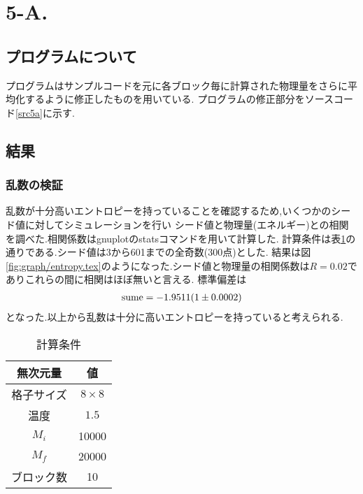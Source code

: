 \section{5-A.}
\subsection{プログラムについて}
プログラムはサンプルコードを元に各ブロック毎に計算された物理量をさらに平均化するように修正したものを用いている.
プログラムの修正部分をソースコード\ref{src5a}に示す.
\subsection{結果}
\subsubsection{乱数の検証}
乱数が十分高いエントロピーを持っていることを確認するため,いくつかのシード値に対してシミュレーションを行い
シード値と物理量(エネルギー)との相関を調べた.相関係数はgnuplotのstatsコマンドを用いて計算した.
計算条件は表\ref{tab:5a1}の通りである.シード値は3から601までの全奇数(300点)とした.
結果は図\ref{fig:graph/entropy.tex}のようになった.シード値と物理量の相関係数は$R=0.02$でありこれらの間に相関はほぼ無いと言える.
標準偏差は
\begin{align}
  {\rm sume}=-1.9511(1\pm0.0002)
\end{align}
となった.以上から乱数は十分に高いエントロピーを持っていると考えられる.
\begin{table}[h]
  \caption{計算条件}
  \label{tab:5a1}
  \centering
  \begin{tabular}{cc}
    \hline
    無次元量&値\\
    \hline \hline
    格子サイズ&$8\times 8$\\
    温度&$1.5$\\
    $M_i$&10000\\
    $M_f$&20000\\
    ブロック数&10\\
    \hline
  \end{tabular}
\end{table}
